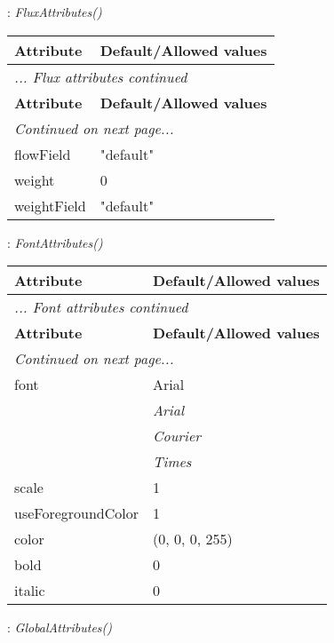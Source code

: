 \documentclass[10pt,a4paper]{report}
\begin{document}
\newpage

{}
: {\it FluxAttributes() }\\[-3mm]

\begin{longtable}{ll}
{\bf Attribute} & {\bf Default/Allowed values} \\
\hline \hline
\endfirsthead
\multicolumn{2}{l}{{\it ... Flux attributes continued}} \\
{\bf Attribute} & {\bf Default/Allowed values} \\
\hline \hline
\endhead
\hline
\multicolumn{2}{l}{{\it Continued on next page...}} \\
\endfoot
\hline
\endlastfoot

flowField  &  "default" \\
weight  &  0 \\
weightField  &  "default" \\
\end{longtable}

\newpage

{}
: {\it FontAttributes() }\\[-3mm]

\begin{longtable}{ll}
{\bf Attribute} & {\bf Default/Allowed values} \\
\hline \hline
\endfirsthead
\multicolumn{2}{l}{{\it ... Font attributes continued}} \\
{\bf Attribute} & {\bf Default/Allowed values} \\
\hline \hline
\endhead
\hline
\multicolumn{2}{l}{{\it Continued on next page...}} \\
\endfoot
\hline
\endlastfoot

font  &  Arial   \\
 & {\it  Arial} \\
 & {\it  Courier} \\
 & {\it  Times} \\
scale  &  1 \\
useForegroundColor  &  1 \\
color  &  (0, 0, 0, 255) \\
bold  &  0 \\
italic  &  0 \\
\end{longtable}

\newpage

{}
: {\it GlobalAttributes() }\\[-3mm]
\end{document}
